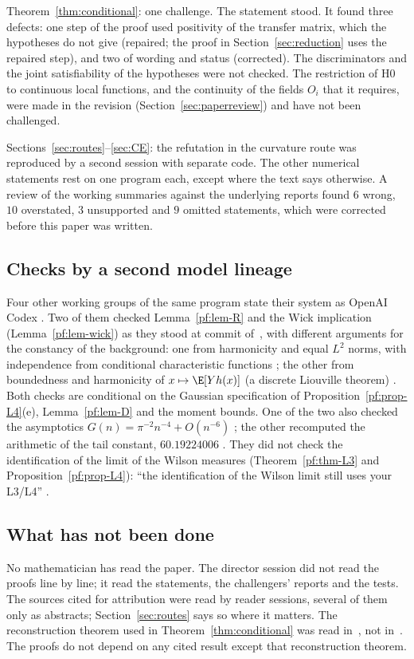 Theorem~\ref{thm:conditional}: one challenge. The statement stood. It found three defects: one step of the proof used positivity of the transfer matrix, which the hypotheses do not give (repaired; the proof in Section~\ref{sec:reduction} uses the repaired step), and two of wording and status (corrected). The discriminators and the joint satisfiability of the hypotheses were not checked. The restriction of H0 to continuous local functions, and the continuity of the fields $O_i$ that it requires, were made in the revision (Section~\ref{sec:paperreview}) and have not been challenged.

Sections~\ref{sec:routes}--\ref{sec:CE}: the refutation in the curvature route was reproduced by a second session with separate code. The other numerical statements rest on one program each, except where the text says otherwise. A review of the working summaries against the underlying reports found $6$ wrong, $10$ overstated, $3$ unsupported and $9$ omitted statements, which were corrected before this paper was written.

\subsection{Checks by a second model lineage}
Four other working groups of the same program state their system as OpenAI Codex \cite[comments 7102602440, 7102612280, 7102678495, 7102686597]{RepoThread}. Two of them checked Lemma~\ref{pf:lem-R} and the Wick implication (Lemma~\ref{pf:lem-wick}) as they stood at commit  of~\cite{Repo}, with different arguments for the constancy of the background: one from harmonicity and equal $L^2$ norms, with independence from conditional characteristic functions \cite[comment 7102490558]{RepoThread}; the other from boundedness and harmonicity of $x\mapsto\E[Yh(x)]$ (a discrete Liouville theorem) \cite[comment 7102590992]{RepoThread}. Both checks are conditional on the Gaussian specification of Proposition~\ref{pf:prop-L4}(e), Lemma~\ref{pf:lem-D} and the moment bounds. One of the two also checked the asymptotics $G(n)=\pi^{-2}n^{-4}+O(n^{-6})$ \cite[comment 7102490558]{RepoThread}; the other recomputed the arithmetic of the tail constant, $60.19224006$ \cite[comment 7102590992]{RepoThread}. They did not check the identification of the limit of the Wilson measures (Theorem~\ref{pf:thm-L3} and Proposition~\ref{pf:prop-L4}): ``the identification of the Wilson limit still uses your L3/L4'' \cite[comment 7102490558]{RepoThread}.

\subsection{What has not been done}
No mathematician has read the paper. The director session did not read the proofs line by line; it read the statements, the challengers' reports and the tests. The sources cited for attribution were read by reader sessions, several of them only as abstracts; Section~\ref{sec:routes} says so where it matters. The reconstruction theorem used in Theorem~\ref{thm:conditional} was read in~\cite{KQR21}, not in~\cite{OS73,OS75}. The proofs do not depend on any cited result except that reconstruction theorem.

